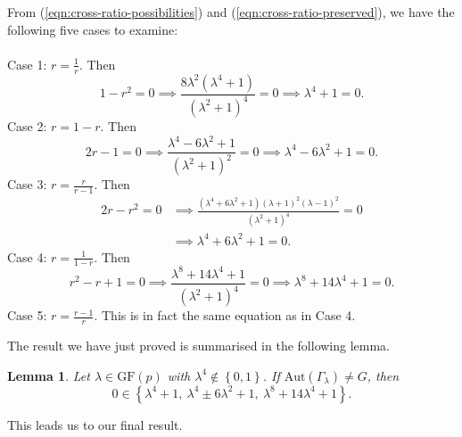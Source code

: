\documentclass[10pt]{amsart}
\theoremstyle{definition}
\theoremstyle{plain}
\newtheorem{lemma}[lemma]{Lemma}
\theoremstyle{plain}
\theoremstyle{plain}
\theoremstyle{plain}
\newcommand{\Aut}{\mathrm{Aut}}
\newcommand{\GF}{\mathrm{GF}}
\begin{document}
From (\ref{eqn:cross-ratio-possibilities}) and (\ref{eqn:cross-ratio-preserved}), we have the following five cases to examine: \\\\
Case 1: $r = \frac{1}{r}$. Then
\begin{displaymath}
1 - r^2 = 0 \implies \frac{8 \lambda^2 \left(\lambda^4 + 1 \right)}{\left(\lambda^2 + 1 \right)^4} = 0 \implies \lambda^4 + 1 = 0.
\end{displaymath}
Case 2: $r = 1-r$. Then
\begin{displaymath}
2r - 1 = 0 \implies \frac{\lambda^4 - 6 \lambda^2 + 1}{\left(\lambda^2 + 1 \right)^2} = 0 \implies \lambda^4 - 6 \lambda^2 + 1 = 0.
\end{displaymath}
Case 3: $r = \frac{r}{r-1}$. Then
\begin{align*}
2r - r^2 = 0 &\implies \frac{\left(\lambda^4 + 6 \lambda^2 + 1 \right) \left(\lambda + 1 \right)^2 \left(\lambda - 1 \right)^2}{\left(\lambda^2 + 1 \right)^4} = 0 \\ &\implies \lambda^4 + 6 \lambda^2 + 1 = 0.
\end{align*}
Case 4: $r = \frac{1}{1-r}$. Then
\begin{displaymath}
r^2 - r + 1 = 0 \implies \frac{\lambda^8 + 14 \lambda^4 + 1}{\left(\lambda^2 + 1 \right)^4} = 0 \implies \lambda^8 + 14 \lambda^4 + 1 = 0.
\end{displaymath}
Case 5: $r = \frac{r-1}{r}$. This is in fact the same equation as in Case 4.

The result we have just proved is summarised in the following lemma.
\begin{lemma} \label{lm:Lambda_lambda}
Let $\lambda \in \GF{\left(p \right)}$ with $\lambda^4 \notin \left\{0, 1 \right\}$. If $\Aut{\left(\Gamma_\lambda \right)} \neq G$, then
\begin{displaymath}
0 \in {\left\{\lambda^4 + 1,\ \lambda^4 \pm 6 \lambda^2 + 1,\ \lambda^8 + 14 \lambda^4 + 1 \right\}}.
\end{displaymath}
\end{lemma}

This leads us to our final result.
\end{document}
